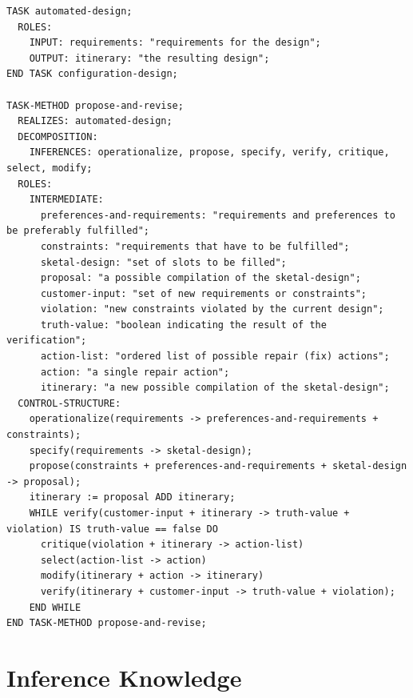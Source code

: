 \documentclass[11pt]{article} %
\begin{document}
\begin{lstlisting}[label=Task,caption=Task and task method description,breaklines=true]
TASK automated-design;
  ROLES:
    INPUT: requirements: "requirements for the design";
    OUTPUT: itinerary: "the resulting design";
END TASK configuration-design;

TASK-METHOD propose-and-revise;
  REALIZES: automated-design;
  DECOMPOSITION:
    INFERENCES: operationalize, propose, specify, verify, critique, select, modify;
  ROLES:
    INTERMEDIATE:
      preferences-and-requirements: "requirements and preferences to be preferably fulfilled";
      constraints: "requirements that have to be fulfilled";
      sketal-design: "set of slots to be filled";
      proposal: "a possible compilation of the sketal-design";
      customer-input: "set of new requirements or constraints";
      violation: "new constraints violated by the current design";
      truth-value: "boolean indicating the result of the verification";
      action-list: "ordered list of possible repair (fix) actions";
      action: "a single repair action";
      itinerary: "a new possible compilation of the sketal-design";
  CONTROL-STRUCTURE:
    operationalize(requirements -> preferences-and-requirements + constraints);
    specify(requirements -> sketal-design);
    propose(constraints + preferences-and-requirements + sketal-design -> proposal);
    itinerary := proposal ADD itinerary;
    WHILE verify(customer-input + itinerary -> truth-value + violation) IS truth-value == false DO
      critique(violation + itinerary -> action-list)
      select(action-list -> action)
      modify(itinerary + action -> itinerary)
      verify(itinerary + customer-input -> truth-value + violation);
    END WHILE
END TASK-METHOD propose-and-revise;
\end{lstlisting}


\section{Inference Knowledge}
\end{document}
